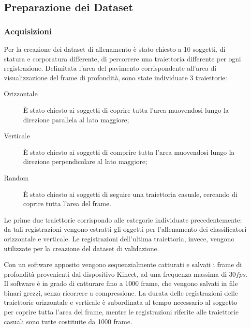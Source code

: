         \subsection{Preparazione dei Dataset}
        \label{sub:datasets_setup}
            \subsubsection{Acquisizioni}
                Per la creazione dei dataset di allenamento è stato chiesto a 10 soggetti, di statura e corporatura differente, di percorrere una traiettoria differente per ogni registrazione.
                Delimitata l'area del pavimento corrispondente all'area di visualizzazione del frame di profondità, sono state individuate 3 traiettorie:
                \begin{description}
                    \item[Orizzontale] È stato chiesto ai soggetti di coprire tutta l'area muovendosi lungo la direzione parallela al lato maggiore;
                    \item[Verticale] È stato chiesto ai soggetti di comprire tutta l'area muovendosi lungo la direzione perpendicolare al lato maggiore;
                    \item[Random] È stato chiesto ai soggetti di seguire una traiettoria casuale, cercando di coprire tutta l'area del frame.
                \end{description}
                Le prime due traiettorie corrispondo alle categorie individuate precedentemente: da tali registrazioni vengono estratti gli oggetti per l'allenamento dei classificatori orizzontale e verticale.
                Le registrazioni dell'ultima traiettoria, invece, vengono utilizzate per la creazione del dataset di validazione.

                Con un software apposito %
                vengono sequenzialmente catturati e salvati i frame di profondità provenienti dal dispositivo Kinect, ad una frequenza massima di $30 fps$.
                Il software è in grado di catturare fino a 1000 frame, che vengono salvati in file binari grezzi, senza ricorrere a compressione.
                La durata delle registrazioni delle traiettorie orizzontale e verticale è subordinata al tempo necessario al soggetto per coprire tutta l'area del frame, mentre le registrazioni riferite alle traiettorie casuali sono tutte costituite da 1000 frame.

